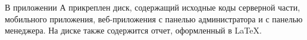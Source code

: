

В приложении А
прикреплен диск, содержащий исходные коды серверной части,
мобильного приложения,
веб-приложения с панелью администратора и с панелью менеджера.
На диске также содержится отчет, оформленный в LaTeX.

\newpage
